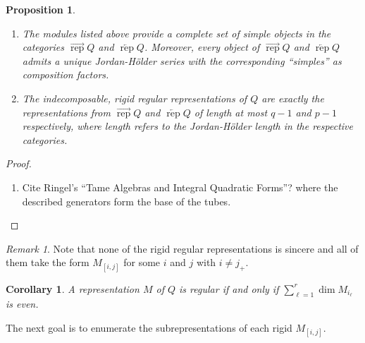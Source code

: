 \documentclass[12pt]{amsart}
\newcommand{\rep}{\operatorname{rep}}
\newtheorem{corollary}[theorem]{Corollary}
\newtheorem{proposition}[theorem]{Proposition}
\theoremstyle{remark}
\newtheorem{remark}[theorem]{Remark}
\numberwithin{equation}{section}
\begin{document}
  \begin{proposition}\mbox{}
    \begin{enumerate}
      \item The modules listed above provide a complete set of simple objects in the categories $\overrightarrow{\rep}Q$ and $\overleftarrow{\rep}Q$.  Moreover, every object of $\overrightarrow{\rep}Q$ and $\overleftarrow{\rep}Q$ admits a unique Jordan-H\"older series with the corresponding ``simples'' as composition factors.
      \item The indecomposable, rigid regular representations of $Q$ are exactly the representations from $\overrightarrow{\rep}Q$ and $\overleftarrow{\rep}Q$ of length at most $q-1$ and $p-1$ respectively, where length refers to the Jordan-H\"older length in the respective categories.  
    \end{enumerate}
  \end{proposition}
  \begin{proof}
    \begin{enumerate}
      \item Cite Ringel's ``Tame Algebras and Integral Quadratic Forms''?  \cite[Theorem 3.6.5]{Rin84} where the described generators form the base of the tubes.
    \end{enumerate}
  \end{proof}
  \begin{remark}\label{rem:rigid regulars}
    Note that none of the rigid regular representations is sincere and all of them take the form $M_{[i,j]}$ for some $i$ and $j$ with $i\ne j_+$.
  \end{remark}

  \begin{corollary}
    A representation $M$ of $Q$ is regular if and only if $\sum\limits_{\ell=1}^r\dim M_{i_\ell}$ is even.
  \end{corollary}

  The next goal is to enumerate the subrepresentations of each rigid $M_{[i,j]}$.  
\end{document}
